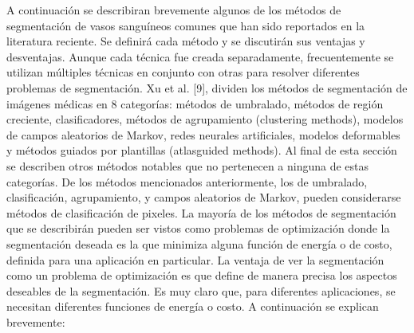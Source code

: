 A continuaci\'on se describiran brevemente algunos de los m\'etodos de segmentaci\'on de vasos sangu\'ineos comunes que han sido reportados en la literatura reciente.
Se definir\'a cada m\'etodo y se discutir\'an sus ventajas y desventajas. Aunque cada t\'ecnica fue
creada separadamente, frecuentemente se utilizan m\'ultiples t\'ecnicas en conjunto con otras
para resolver diferentes problemas de segmentaci\'on.
Xu et al. [9], dividen los m\'etodos de segmentaci\'on de im\'agenes m\'edicas en 8
categor\'ias: m\'etodos de umbralado, m\'etodos de regi\'on creciente, clasificadores, m\'etodos
de agrupamiento (clustering methods), modelos de campos aleatorios de Markov, redes
neurales artificiales, modelos deformables y m\'etodos guiados por plantillas (atlasguided
methods). Al final de esta secci\'on se describen otros m\'etodos notables que no pertenecen a
ninguna de estas categor\'ias. De los m\'etodos mencionados anteriormente, los de
umbralado, clasificaci\'on, agrupamiento, y campos aleatorios de Markov, pueden
considerarse m\'etodos de clasificaci\'on de pixeles.
La mayor\'ia de los m\'etodos de segmentaci\'on que se describir\'an pueden ser vistos
como problemas de optimizaci\'on donde la segmentaci\'on deseada es la que minimiza alguna
funci\'on de energ\'ia o de costo, definida para una aplicaci\'on en particular. La ventaja de ver
la segmentaci\'on como un problema de optimizaci\'on es que define de manera precisa los
aspectos deseables de la segmentaci\'on. Es muy claro que, para diferentes aplicaciones, se
necesitan diferentes funciones de energ\'ia o costo. A continuaci\'on se explican brevemente:

